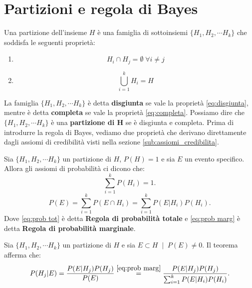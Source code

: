 \documentclass[../main.tex]{subfiles}
\begin{document}
\section{Partizioni e regola di Bayes}
\begin{definition}
    Una partizione dell'insieme $H$ è una famiglia di sottoinsiemi $\{ H_{1},H_{2},\cdots H_{k}\}$ che soddisfa le seguenti proprietà:
    \begin{enumerate}
        \item \begin{equation}
            \label{eq:disgiunta}
             H_{i}\cap H_{j}=\emptyset \; \forall  i\neq j
        \end{equation}
        \item \begin{equation}
            \label{eq:completa}
            \bigcup_{i=1}^{k}H_{i}=H
        \end{equation}
    \end{enumerate}
\end{definition}
\hfill \break
La famiglia $\{ H_{1},H_{2},\cdots H_{k}\}$ è detta \textbf{disgiunta} se vale la proprietà \ref{eq:disgiunta}, mentre è detta \textbf{completa} se vale la proprietà \ref{eq:completa}.
Possiamo dire che $\{ H_{1},H_{2},\cdots H_{k}\}$ è una \textbf{partizione di H} se è disgiunta e completa.
\hfill \break
Prima di introdurre la regola di Bayes, vediamo due proprietà che derivano direttamente dagli assiomi di credibilità visti nella sezione \ref*{sub:assiomi_credibilita}.
\break
\begin{lemma}
    \label{lem:prob marg}
    Sia $\{ H_{1},H_{2},\cdots H_{k}\}$ un partizione di $H$, $P(H)=1$ e sia $E$ un evento specifico. Allora gli assiomi di probabilità ci dicono che:
        \begin{equation}\label{eq:prob tot}
            \sum_{i=1}^{k}P(H_{i})=1.
        \end{equation}
        \begin{equation}\label{eq:prob marg}
            P(E)=\sum_{i=1}^{k}P(E\cap H_{i})=\sum_{i=1}^{k}P(E|H_{i})P(H_{i}).
        \end{equation}
Dove \ref{eq:prob tot} è detta \textbf{Regola di probabilità totale} e \ref{eq:prob marg} è detta \textbf{Regola di probabilità marginale}.
\end{lemma}
\begin{theorem}\label{th:teorema_bayes}
    Sia $\{ H_{1},H_{2},\cdots H_{k}\}$ un partizione di $H$ e sia $E \subset H \; \mid \; P(E)\ne 0$. Il teorema afferma che:
\begin{equation}\label{eq:regola_bayes}
    P(H_{j}|E)=\frac{P(E|H_{j})P(H_{j})}{P(E)}\stackrel{\ref{eq:prob marg}}{=}\frac{P(E|H_{j})P(H_{j})}{\sum_{i=1}^{k}P(E|H_{i})P(H_{i})}.
\end{equation}
\end{theorem}
\end{document}
